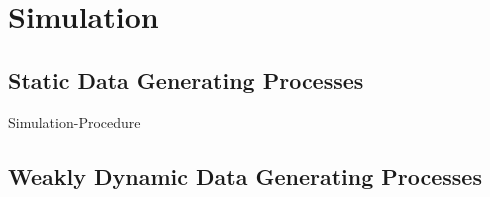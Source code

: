 \section{Simulation}

\subsection{Static Data Generating Processes}

Simulation-Procedure


\subsection{Weakly Dynamic Data Generating Processes}
